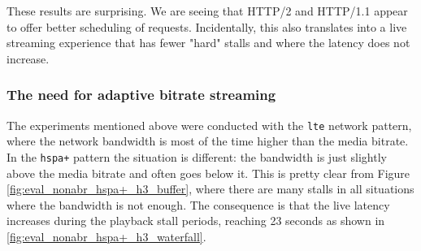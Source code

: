 These results are surprising. We are seeing that HTTP/2 and HTTP/1.1 appear to offer better scheduling of requests. Incidentally, this also translates into a live streaming experience that has fewer "hard" stalls and where the latency does not increase.

\subsubsection{The need for adaptive bitrate streaming}
\label{sec:eval/non-abr/adaptive}

The experiments mentioned above were conducted with the \texttt{lte} network pattern, where the network bandwidth is most of the time higher than the media bitrate. In the \texttt{hspa+} pattern the situation is different: the bandwidth is just slightly above the media bitrate and often goes below it. This is pretty clear from Figure \ref{fig:eval_nonabr_hspa+_h3_buffer}, where there are many stalls in all situations where the bandwidth is not enough. The consequence is that the live latency increases during the playback stall periods, reaching 23 seconds as shown in \ref{fig:eval_nonabr_hspa+_h3_waterfall}.

